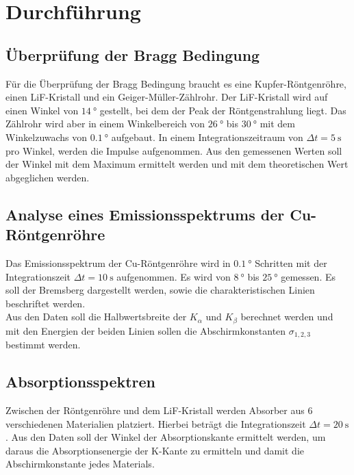 \section{Durchführung}
\label{sec:Durchführung}

\subsection{Überprüfung der Bragg Bedingung}
Für die Überprüfung der Bragg Bedingung braucht es eine Kupfer-Röntgenröhre, einen LiF-Kristall und ein Geiger-Müller-Zählrohr.
Der LiF-Kristall wird auf einen Winkel von $\SI{14}{\degree}$ gestellt, bei dem der Peak der Röntgenstrahlung liegt.
Das Zählrohr wird aber in einem Winkelbereich von $\SI{26}{\degree}$ bis $\SI{30}{\degree}$ mit dem Winkelzuwachs von $\SI{0.1}{\degree}$ aufgebaut.
In einem Integrationszeitraum von $\Delta t = \SI{5}{\second}$ pro Winkel, werden die Impulse aufgenommen.
Aus den gemessenen Werten soll der Winkel mit dem Maximum ermittelt werden und mit dem theoretischen Wert abgeglichen werden.

\subsection{Analyse eines Emissionsspektrums der Cu-Röntgenröhre}
Das Emissionsspektrum der Cu-Röntgenröhre wird in $\SI{0.1}{\degree}$ Schritten mit der Integrationszeit $\Delta t = \SI{10}{\second}$ aufgenommen.
Es wird von $\SI{8}{\degree}$ bis $\SI{25}{\degree}$ gemessen.
Es soll der Bremsberg dargestellt werden, sowie die charakteristischen Linien beschriftet werden.\\
Aus den Daten soll die Halbwertsbreite der $K_{\alpha}$ und $K_{\beta}$ berechnet werden und mit den Energien der beiden Linien sollen die Abschirmkonstanten $\sigma_{1,2,3}$ bestimmt werden.

\subsection{Absorptionsspektren}
Zwischen der Röntgenröhre und dem LiF-Kristall werden Absorber aus 6 verschiedenen Materialien platziert.
Hierbei beträgt die Integrationszeit $\Delta t = \SI{20}{\second}$.
Aus den Daten soll der Winkel der Absorptionskante ermittelt werden, um daraus die Absorptionsenergie der K-Kante zu ermitteln und damit die Abschirmkonstante jedes Materials.